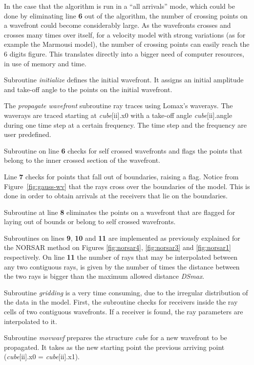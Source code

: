 In the case that the algorithm is run in a ``all arrivals'' mode,
which could be done by eliminating line {\bf 6} out of the algorithm, 
the number of crossing points on a wavefront could become considerably
large. As the wavefronts crosses and crosses many times over itself, for
a velocity model with strong variations (as for example the Marmousi 
model), the number of crossing points
can easily reach the
6 digits figure. This translates directly into a bigger need of computer
resources, in use of memory and time. 

Subroutine {\em initialize} defines the initial wavefront. It assigns
an initial amplitude and take-off angle to the points on the initial
wavefront.

The {\em propagate wavefront} subroutine ray traces using Lomax's
waverays. The waverays are traced starting at {\it cube\/}[ii].x0
with a take-off angle {\it cube\/}[ii].angle during one time step
at a certain frequency. The time step and the frequency are user
predefined.

Subroutine on line {\bf 6} checks for self crossed wavefronts and flags
the points that belong to the inner crossed section of the wavefront.

Line {\bf 7} checks for points that fall out of boundaries, raising
a flag. Notice
from Figure~\ref{fig:gauss-wv} that the rays cross over
the boundaries of the model. This is done in order to obtain arrivals
at the receivers that lie on the boundaries.

Subroutine at line {\bf 8} eliminates the points on a wavefront
that are flagged for laying out of bounds or belong
to self crossed wavefronts.

Subroutines on lines {\bf 9}, {\bf 10} and {\bf 11} are implemented 
as previously explained for the NORSAR method on Figures \ref{fig:norsar4},
\ref{fig:norsar3} and \ref{fig:norsar1} respectively. On line {\bf 11} the
number of rays that may be interpolated between any two contiguous
rays, is given by the number of times the distance between the two rays is
bigger than the maximum allowed distance {\it DSmax\/}.

Subroutine {\it gridding\/} is a very time consuming, due to
the irregular distribution of the data in the model. First, the
subroutine checks for receivers inside the ray cells of two contiguous
wavefronts. If a receiver is found, the ray parameters are interpolated
to it.

Subroutine {\it movwavf} prepares the structure {\it cube\/}
for a new wavefront to be propagated. It takes 
as the new starting point the previous arriving
point ({\it cube\/}[ii].x0 = {\it cube\/}[ii].x1).


